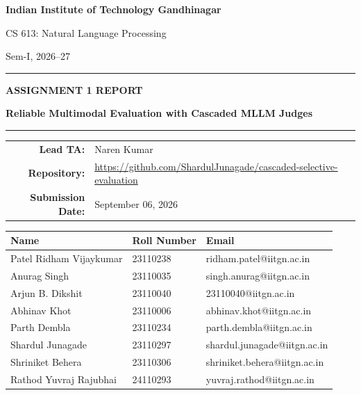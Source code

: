 \documentclass[11pt,a4paper]{article}
\newcommand{\projecttitle}{\textbf{Reliable Multimodal Evaluation with Cascaded MLLM Judges}}
\newcommand{\course}{CS 613: Natural Language Processing}
\newcommand{\semester}{Sem-I, 2026--27}
\begin{document}
\begin{titlepage}
    \centering
    
    {\Large \textbf{Indian Institute of Technology Gandhinagar}\par}
    \vspace{0.25cm}
    {\large \course \par}
    {\large \semester \par}
    
    \vspace{1.4cm}
    \rule{\textwidth}{0.6pt}
    
    \vspace{0.6cm}
    {\LARGE \textbf{ASSIGNMENT 1 REPORT}\par}
    \vspace{0.45cm}
    {\Large \projecttitle\par}
    
    \vspace{0.6cm}
    \rule{\textwidth}{0.6pt}
    
    \vfill
    
    \begin{tabular}{rl}
        \textbf{Lead TA:} & Naren Kumar \\
        \textbf{Repository:} & \url{https://github.com/ShardulJunagade/cascaded-selective-evaluation} \\
        \textbf{Submission Date:} & September 06, 2026 \\
    \end{tabular}
    
    \vspace{1cm}
    
    \begin{table}[H]
    \centering
    \begin{tabularx}{0.9\textwidth}{|X|X|X|}
        \hline
        \textbf{Name} & \textbf{Roll Number} & \textbf{Email} \\
        \hline
        Patel Ridham Vijaykumar & 23110238 & ridham.patel@iitgn.ac.in \\
        \hline
        Anurag Singh & 23110035 & singh.anurag@iitgn.ac.in \\
        \hline
        Arjun B. Dikshit & 23110040 & 23110040@iitgn.ac.in \\
        \hline
        Abhinav Khot & 23110006 & abhinav.khot@iitgn.ac.in \\
        \hline
        Parth Dembla & 23110234 & parth.dembla@iitgn.ac.in \\
        \hline
        Shardul Junagade & 23110297 & shardul.junagade@iitgn.ac.in \\
        \hline
        Shriniket Behera & 23110306 
& shriniket.behera@iitgn.ac.in \\
        \hline
        Rathod Yuvraj Rajubhai & 24110293 & yuvraj.rathod@iitgn.ac.in \\
        \hline


\end{tabularx}
\end{table}
\end{titlepage}
\end{document}
